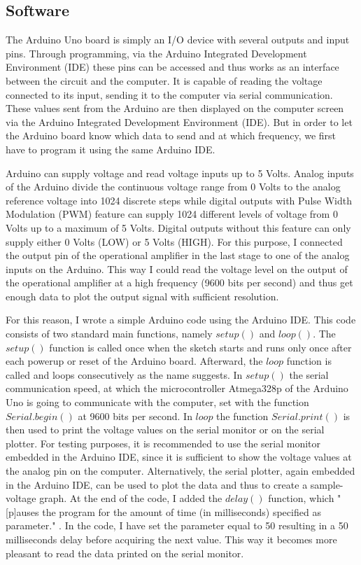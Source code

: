 \subsection{Software}
The Arduino Uno board is simply an I/O device with several outputs and input pins. Through programming, via the Arduino Integrated Development Environment (IDE) these pins can be accessed and thus works as an interface between the circuit and the computer. It is capable of reading the voltage connected to its input, sending it to the computer via serial communication. These values sent from the Arduino are then displayed on the computer screen via the Arduino Integrated Development Environment (IDE). But in order to let the Arduino board know which data to send and at which frequency, we first have to program it using the same Arduino IDE.\par
Arduino can supply voltage and read voltage inputs up to 5 Volts. Analog inputs of the Arduino divide the continuous voltage range from 0 Volts to the analog reference voltage into 1024 discrete steps while digital outputs with Pulse Width Modulation (PWM) feature can supply 1024 different levels of voltage from 0 Volts up to a maximum of 5 Volts. Digital outputs without this feature can only supply either 0 Volts (LOW) or 5 Volts (HIGH). For this purpose, I connected the output pin of the operational amplifier in the last stage to one of the analog inputs on the Arduino. This way I could read the voltage level on the output of the operational amplifier at a high frequency (9600 bits per second) and thus get enough data to plot the output signal with sufficient resolution. \par
For this reason, I wrote a simple Arduino code using the Arduino IDE. This code consists of two standard main functions, namely $setup()$ and $loop()$. The $setup()$ function is called once when the sketch starts and runs only once after each powerup or reset of the Arduino board. Afterward, the $loop$ function is called and loops consecutively as the name suggests. In $setup()$ the serial communication speed, at which the microcontroller Atmega328p of the Arduino Uno is going to communicate with the computer, set with the function $Serial.begin()$ at 9600 bits per second. In $loop$ the function $Serial.print()$ is then used to print the voltage values on the serial monitor or on the serial plotter. For testing purposes, it is recommended to use the serial monitor embedded in the Arduino IDE, since it is sufficient to show the voltage values at the analog pin on the computer. Alternatively, the serial plotter, again embedded in the Arduino IDE, can be used to plot the data and thus to create a sample-voltage graph. At the end of the code, I added the $delay()$ function, which "[p]auses the program for the amount of time (in milliseconds) specified as parameter." \cite{delay}. In the code, I have set the parameter equal to 50 resulting in a 50 milliseconds delay before acquiring the next value. This way it becomes more pleasant to read the data printed on the serial monitor.


